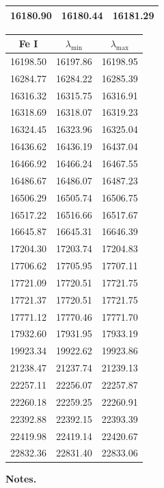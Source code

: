 \documentclass{article}
\begin{document}
\begin{table}[h!]
\begin{minipage}[t]{.4\linewidth}
\begin{center}
\begin{tabular}{ccc}
          16180.90 & 16180.44 & 16181.29 \\
          \hline
      \end{tabular}
  \end{center} 
  \end{minipage} 
  \hspace{2.cm}
  \begin{minipage}[t]{.4\linewidth}
  \begin{center}
     \begin{tabular}{ccc}
          \hline
      \hline
      Fe I & $\lambda_{\mathrm{min}}$ & $\lambda_{\mathrm{max}}$ \\
      \hline
      16198.50 & 16197.86 & 16198.95 \\
      16284.77 & 16284.22 & 16285.39 \\
      16316.32 & 16315.75 & 16316.91 \\
      16318.69 & 16318.07 & 16319.23 \\
      16324.45 & 16323.96 & 16325.04 \\
      16436.62 & 16436.19 & 16437.04 \\
      16466.92 & 16466.24 & 16467.55 \\
      16486.67 & 16486.07 & 16487.23 \\
      16506.29 & 16505.74 & 16506.75 \\
      16517.22 & 16516.66 & 16517.67 \\
      16645.87 & 16645.31 & 16646.39 \\
      17204.30 & 17203.74 & 17204.83 \\
      17706.62 & 17705.95 & 17707.11 \\
      17721.09 & 17720.51 & 17721.75 \\
      17721.37 & 17720.51 & 17721.75 \\
      17771.12 & 17770.46 & 17771.70 \\
      17932.60 & 17931.95 & 17933.19 \\
      19923.34 & 19922.62 & 19923.86 \\
      21238.47 & 21237.74 & 21239.13 \\
      22257.11 & 22256.07 & 22257.87 \\
      22260.18 & 22259.25 & 22260.91 \\
      22392.88 & 22392.15 & 22393.39 \\
      22419.98 & 22419.14 & 22420.67 \\
      22832.36 & 22831.40 & 22833.06 \\
          \hline
      \end{tabular}
    \end{center}
  \end{minipage}
  \vspace{0.3cm}
  
  \textbf{Notes.}
  \end{table}
\end{document}
